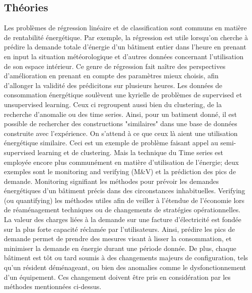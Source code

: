 \documentclass[a4paper]{article}
\begin{document}
\begin{multicols}{2}
\subsection{Théories}

Les problèmes de régression linéaire et de classification sont communs en matière de rentabilité énergétique. Par exemple, la régression est utile lorsqu’on cherche à prédire la demande totale d’énergie d’un bâtiment entier dans l’heure en prenant en input la situation météorologique et d’autres données concernant l’utilisation de son espace intérieur. Ce genre de régression fait naître des perspectives d’amélioration en prenant en compte des paramètres mieux choisis, afin d’allonger la validité des prédicitons sur plusieurs heures. Les données de consommation énergétique soulèvent une kyrielle de problèmes de supervised et unsupervised learning. Ceux ci regroupent aussi bien du clustering, de la recherche d’anomalie ou des time series. Ainsi, pour un batiment donné, il est possible de rechercher des constructions "similaires" dans une base de données construite avec l’expérience. On s’attend à ce que ceux là aient une utilisation énergétique similaire. Ceci est un exemple de problème faisant appel au semi-supervised learning et de clustering. Mais la technique du Time series est employée encore plus communément en matière d’utilisation de l’énergie; deux exemples sont le monitoring and verifying (M\&V) et la prédiction des pics de demande. Monitoring signifiant les méthodes pour prévoir les demandes énergétiques d’un bâtiment précis dans des circonstances inhabituelles. Verifying (ou quantifying) les méthodes utiles afin de veiller à l’étendue de l’économie lors de réaménagement techniques ou de changements de stratégies opérationnelles. La valeur des charges liées à la demande sur une facture d’électricité est fondée sur la plus forte capacité réclamée par l’utilisateurs. Ainsi, prédire les pics de demande permet de prendre des mesures visant à lisser la consommation, et minimiser la demande en énergie durant une période donnée. De plus, chaque bâtiment est tôt ou tard soumis à des changements majeurs de configuration, tels qu’un résident déménageant, ou bien des anomalies comme le  dysfonctionnement d’un équipement. Ces changement doivent être pris en considération par les méthodes mentionnées ci-dessus.


\end{multicols}
\end{document}

